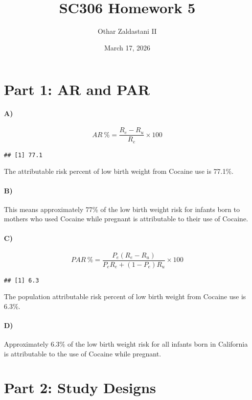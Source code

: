 \documentclass[
]{article}
\title{SC306 Homework 5}
\author{Othar Zaldastani II}
\date{March 17, 2026}
\begin{document}
\maketitle

\section{Part 1: AR and PAR}\label{part-1-ar-and-par}

\paragraph{A)}\label{a}

\[AR \ \% = \frac{R_e - R_u}{R_e} \times 100\]

\begin{verbatim}
## [1] 77.1
\end{verbatim}

The attributable risk percent of low birth weight from Cocaine use is
77.1\%.

\paragraph{B)}\label{b}

This means approximately 77\% of the low birth weight risk for infants
born to mothers who used Cocaine while pregnant is attributable to their
use of Cocaine.

\paragraph{C)}\label{c}

\[PAR \ \% = \frac{P_e(R_e - R_u)}{P_e R_e + (1-P_e)R_u} \times 100\]

\begin{verbatim}
## [1] 6.3
\end{verbatim}

The population attributable risk percent of low birth weight from
Cocaine use is 6.3\%.

\paragraph{D)}\label{d}

Approximately 6.3\% of the low birth weight risk for all infants born in
California is attributable to the use of Cocaine while pregnant.

\pagebreak

\section{Part 2: Study Designs}\label{part-2-study-designs}
\end{document}
